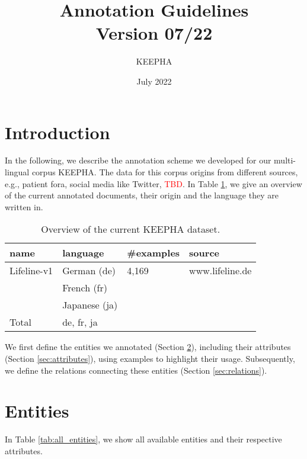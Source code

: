 \documentclass[12pt]{article}
\title{Annotation Guidelines\\ Version 07/22}
\author{KEEPHA}
\date{July 2022}
\theoremstyle{definition}
\begin{document}
\maketitle

\tableofcontents
\clearpage

\section{Introduction}
In the following, we describe the annotation scheme we developed for our multi-lingual corpus KEEPHA.
The data for this corpus origins from different sources, e.g., patient fora, social media like Twitter, \textcolor{red}{TBD}.
In Table \ref{tab:data}, we give an overview of the current annotated documents, their origin and the language they are written in.

\begin{table}[h]
\centering
\begin{tabular}{@{}llll@{}}
\toprule
\textbf{name}   & {\textbf{language}}   & \textbf{\#examples}   & \textbf{source} \\ \midrule

Lifeline-v1     &  German (de)          & 4,169                 &  www.lifeline.de \\ 

                & French (fr)           &                       &                   \\
                & Japanese (ja)         &                       &                   \\
\midrule

Total           & de, fr, ja            &                       & \\

\bottomrule
\end{tabular}
\caption{Overview of the current KEEPHA dataset.}
\label{tab:data}
\end{table}


We first define the entities we annotated (Section \ref{sec:entities}), including their attributes (Section \ref{sec:attributes}), using examples to highlight their usage.
Subsequently, we define the relations connecting these entities (Section \ref{sec:relations}).


\section{Entities}\label{sec:entities}

In Table \ref{tab:all_entities}, we show all available entities and their respective attributes.
\end{document}
